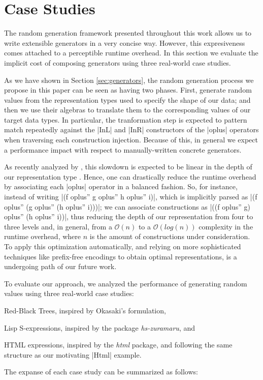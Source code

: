 \section{Case Studies}
\label{sec:casestudies}

The random generation framework presented throughout this work allows us to
write extensible generators in a very concise way.
%
However, this expresiveness comes attached to a perceptible runtime overhead.
%
In this section we evaluate the implicit cost of composing generators using
three real-world case studies.


As we have shown in Section \ref{sec:generators}, the random generation
process we propose in this paper can be seen as having two phases.
%
First, generate random values from the representation types used to specify the
shape of our data; and then we use their algebras to translate them to the
corresponding values of our target data types.
%
In particular, the tranformation step is expected to pattern match repeatedly
against the |InL| and |InR| constructors of the |oplus| operators when
traversing each construction injection.
%
Because of this, in general we expect a performance impact with respect to
manually-written concrete generators.


As recently analyzed by \citeauthor{KiriyamaOptimizingDTC}, this slowdown is
expected to be linear in the depth of our representation type
\cite{KiriyamaOptimizingDTC}.
%
Hence, one can drastically reduce the runtime overhead by associating each
|oplus| operator in a balanced fashion.
%
So, for instance, instead of writing |(f oplus'' g oplus'' h oplus'' i)|, which
is implicitly parsed as |(f oplus'' (g oplus'' (h oplus'' i)))|; we can
associate constructions as |((f oplus'' g) oplus'' (h oplus'' i))|, thus
reducing the depth of our representation from four to three levels and, in
general, from a $\mathcal{O}(n)$ to a $\mathcal{O}(log(n))$ complexity in the
runtime overhead, where $n$ is the amount of constructions under consideration.
%
To apply this optimization automatically, and relying on more sophisticated
techniques like prefix-free encodings to obtain optimal representations, is a
undergoing path of our future work.



To evaluate our approach, we analyzed the performance of generating random
values using three real-world case studies:
\begin{inparaenum}[(i)]
\item Red-Black Trees, inspired by Okasaki's formulation,
\item Lisp S-expressions, inspired by the package \emph{hs-zuramaru}, and
\item HTML expressions, inspired by the \emph{html} package, and following the
  same structure as our motivating |Html| example.
\end{inparaenum}
%
The expanse of each case study can be summarized as follows:

